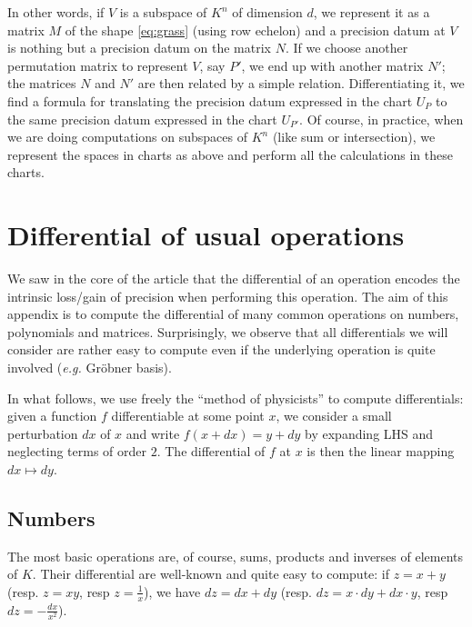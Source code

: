 \documentclass{lms}
\begin{document}
In other words, if $V$ is a subspace of $K^n$ of dimension $d$, we 
represent it as a matrix $M$ of the shape \eqref{eq:grass} (using row 
echelon) and a precision datum at $V$ is nothing but a precision datum on 
the matrix $N$. If we choose another permutation matrix to represent $V$, 
say $P'$, we end up with another matrix $N'$; the matrices $N$ and $N'$ 
are then related by a simple relation. Differentiating it, we find a 
formula for translating the precision datum expressed in the chart $U_P$ 
to the same precision datum expressed in the chart $U_{P'}$.
Of course, in practice, when we are doing computations on subspaces of
$K^n$ (like sum or intersection), we represent the spaces in charts as
above and perform all the calculations in these charts.

\section{Differential of usual operations}
\label{sec:differentials}

We saw in the core of the article that the differential of an operation 
encodes the intrinsic loss/gain of precision when performing this 
operation. The aim of this appendix is to compute the differential of 
many common operations on numbers, polynomials and matrices. Surprisingly, 
we observe that all differentials we will consider are rather easy to 
compute even if the underlying operation is quite involved (\emph{e.g.} 
Gr\"obner basis).

In what follows, we use freely the ``method of physicists'' to compute 
differentials: given a function $f$ differentiable at some point $x$, we 
consider a small perturbation $dx$ of $x$ and write $f(x+dx) = y + dy$ 
by expanding LHS and neglecting terms of order $2$. The differential of 
$f$ at $x$ is then the linear mapping $dx \mapsto dy$.

\subsection{Numbers}

The most basic operations are, of course, sums, products and inverses of 
elements of $K$. Their differential are well-known and quite easy to 
compute: if $z = x + y$ (resp. $z = xy$, resp $z = \frac 1 x$), we have 
$dz = dx + dy$ (resp. $dz = x \cdot dy + dx \cdot y$, resp $dz = - 
\frac{dx}{x^2}$).
\end{document}
